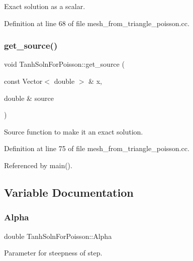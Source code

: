 Exact solution as a scalar. 



Definition at line 68 of file mesh\+\_\+from\+\_\+triangle\+\_\+poisson.\+cc.

\mbox{\label{namespaceTanhSolnForPoisson_ae1b9d6789ff301e3d63a4e292213036c}} 
\subsubsection{\texorpdfstring{get\+\_\+source()}{get\_source()}}
{\footnotesize\ttfamily void Tanh\+Soln\+For\+Poisson\+::get\+\_\+source (\begin{DoxyParamCaption}\item[{const Vector$<$ double $>$ \&}]{x,  }\item[{double \&}]{source }\end{DoxyParamCaption})}



Source function to make it an exact solution. 



Definition at line 75 of file mesh\+\_\+from\+\_\+triangle\+\_\+poisson.\+cc.



Referenced by main().



\subsection{Variable Documentation}
\mbox{\label{namespaceTanhSolnForPoisson_ae676ccd186d5df119cce811596d949c1}} 
\subsubsection{\texorpdfstring{Alpha}{Alpha}}
{\footnotesize\ttfamily double Tanh\+Soln\+For\+Poisson\+::\+Alpha}



Parameter for steepness of step. 



